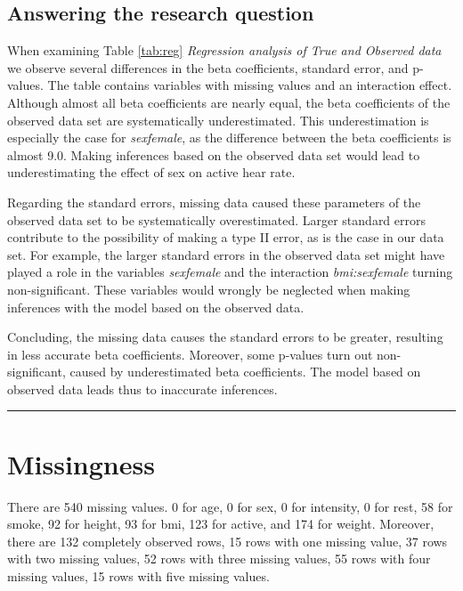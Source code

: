 \documentclass[
]{article}
\begin{document}
\hypertarget{answering-the-research-question}{%
\subsection{Answering the research question}\label{answering-the-research-question}}

When examining Table \ref{tab:reg} \emph{Regression analysis of True and Observed data} we observe several differences in the beta coefficients, standard error, and p-values. The table contains variables with missing values and an interaction effect. Although almost all beta coefficients are nearly equal, the beta coefficients of the observed data set are systematically underestimated. This underestimation is especially the case for \emph{sexfemale}, as the difference between the beta coefficients is almost 9.0. Making inferences based on the observed data set would lead to underestimating the effect of sex on active hear rate.

Regarding the standard errors, missing data caused these parameters of the observed data set to be systematically overestimated. Larger standard errors contribute to the possibility of making a type II error, as is the case in our data set. For example, the larger standard errors in the observed data set might have played a role in the variables \emph{sexfemale} and the interaction \emph{bmi:sexfemale} turning non-significant. These variables would wrongly be neglected when making inferences with the model based on the observed data.

Concluding, the missing data causes the standard errors to be greater, resulting in less accurate beta coefficients. Moreover, some p-values turn out non-significant, caused by underestimated beta coefficients. The model based on observed data leads thus to inaccurate inferences.

\begin{center}\rule{0.5\linewidth}{0.5pt}\end{center}

\hypertarget{miss}{%
\section{Missingness}\label{miss}}

There are 540 missing values. 0 for age, 0 for sex, 0 for intensity, 0 for rest, 58 for smoke, 92 for height, 93 for bmi, 123 for active, and 174 for weight. Moreover, there are 132 completely observed rows, 15 rows with one missing value, 37 rows with two missing values, 52 rows with three missing values, 55 rows with four missing values, 15 rows with five missing values.
\end{document}
